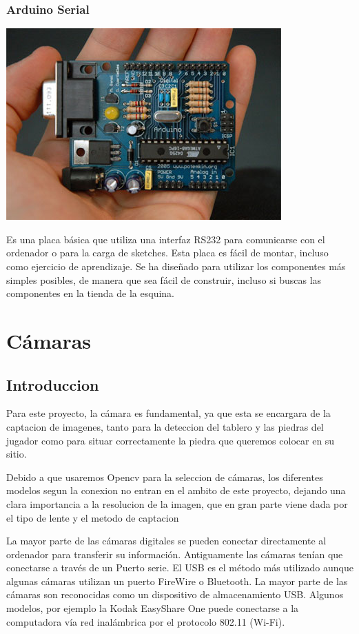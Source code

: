 \documentclass[12pt,a4paper]{report}
\begin{document}
\subsection{Arduino Serial}

\includegraphics[scale=0.6]{arduino.jpg}

Es una placa básica que utiliza una interfaz RS232 para comunicarse con el
ordenador o para la carga de sketches. Esta placa es fácil de montar, incluso
como ejercicio de aprendizaje. Se ha diseñado para utilizar los componentes más
simples posibles, de manera que sea fácil de construir, incluso si buscas las
componentes en la tienda de la esquina.







\chapter{Cámaras}
\section{Introduccion}

Para este proyecto, la cámara es fundamental, ya que esta se encargara de la
captacion de imagenes, tanto para la deteccion del tablero y las piedras del
jugador como para situar correctamente la piedra que queremos colocar en su
sitio.

Debido a que usaremos Opencv para la seleccion de cámaras, los diferentes
modelos segun la conexion no entran en el ambito de este proyecto, dejando una
clara importancia a la resolucion de la imagen, que en gran parte viene dada por
el tipo de lente y el metodo de captacion 

La mayor parte de las cámaras digitales se pueden conectar directamente al
ordenador para transferir su información. Antiguamente las cámaras tenían que
conectarse a través de un Puerto serie. El USB es el método más utilizado aunque
algunas cámaras utilizan un puerto FireWire o Bluetooth. La mayor parte de las
cámaras son reconocidas como un dispositivo de almacenamiento USB. Algunos
modelos, por ejemplo la Kodak EasyShare One puede conectarse a la computadora
vía red inalámbrica por el protocolo 802.11 (Wi-Fi).
\end{document}
